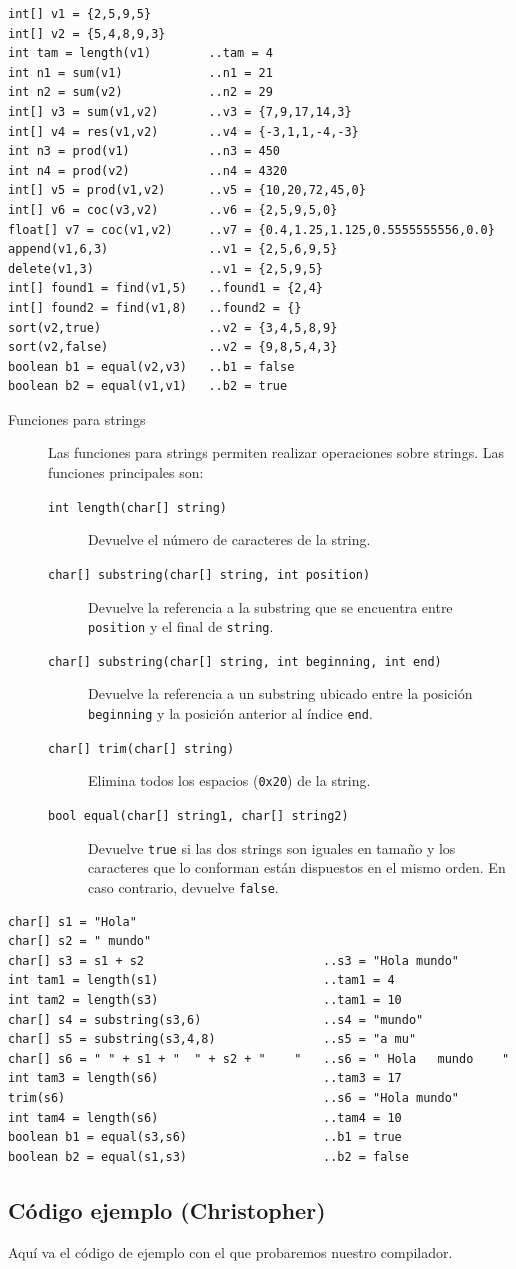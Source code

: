 \documentclass[11pt, english]{article}
\begin{document}
\begin{lstlisting}[frame=single, caption=Ejemplo de uso de funciones primitivas para arrays numéricos]
int[] v1 = {2,5,9,5}		
int[] v2 = {5,4,8,9,3}		
int tam = length(v1)		..tam = 4
int n1 = sum(v1)			..n1 = 21
int n2 = sum(v2)			..n2 = 29
int[] v3 = sum(v1,v2)		..v3 = {7,9,17,14,3}
int[] v4 = res(v1,v2)		..v4 = {-3,1,1,-4,-3}
int n3 = prod(v1)			..n3 = 450
int n4 = prod(v2)			..n4 = 4320
int[] v5 = prod(v1,v2)		..v5 = {10,20,72,45,0}
int[] v6 = coc(v3,v2)		..v6 = {2,5,9,5,0}
float[] v7 = coc(v1,v2)		..v7 = {0.4,1.25,1.125,0.5555555556,0.0}
append(v1,6,3)				..v1 = {2,5,6,9,5}
delete(v1,3)				..v1 = {2,5,9,5}
int[] found1 = find(v1,5)	..found1 = {2,4}
int[] found2 = find(v1,8)	..found2 = {}
sort(v2,true)				..v2 = {3,4,5,8,9}
sort(v2,false)				..v2 = {9,8,5,4,3}
boolean b1 = equal(v2,v3)	..b1 = false
boolean b2 = equal(v1,v1)	..b2 = true
\end{lstlisting}

\begin{description} 
	\item[Funciones para strings] Las funciones para strings permiten realizar operaciones sobre strings. Las funciones principales son:
	\begin{description} 
		\item[\texttt{int length(char[] string)}] Devuelve el número de caracteres de la string.
		\item[\texttt{char[] substring(char[] string, int position)}] Devuelve la referencia a la substring que se encuentra entre \texttt{position} y el final de \texttt{string}.
		\item[\texttt{char[] substring(char[] string, int beginning, int end)}] Devuelve la referencia a un substring ubicado entre la posición \texttt{beginning} y la posición anterior al índice \texttt{end}.
		\item[\texttt{char[] trim(char[] string)}] Elimina todos los espacios (\texttt{0x20}) de la string. 
		\item[\texttt{bool equal(char[] string1, char[] string2)}] Devuelve \texttt{true} si las dos strings son iguales en tamaño y los caracteres que lo conforman están dispuestos en el mismo orden. En caso contrario, devuelve \texttt{false}.
	\end{description}
\end{description}

\begin{lstlisting}[frame=single, caption=Ejemplo de uso de funciones primitivas para strings]
char[] s1 = "Hola"
char[] s2 = " mundo"
char[] s3 = s1 + s2							..s3 = "Hola mundo"
int tam1 = length(s1)						..tam1 = 4
int tam2 = length(s3)						..tam1 = 10
char[] s4 = substring(s3,6)					..s4 = "mundo"
char[] s5 = substring(s3,4,8)				..s5 = "a mu"
char[] s6 = " " + s1 + "  " + s2 + "    "	..s6 = " Hola   mundo    "
int tam3 = length(s6)						..tam3 = 17
trim(s6)									..s6 = "Hola mundo"
int tam4 = length(s6)						..tam4 = 10
boolean b1 = equal(s3,s6)					..b1 = true
boolean b2 = equal(s1,s3)					..b2 = false
\end{lstlisting}

\newpage

\subsection{Código ejemplo (Christopher)}
Aquí va el código de ejemplo con el que probaremos nuestro compilador.
\end{document}
